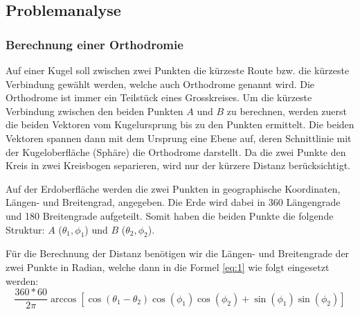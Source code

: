 \subsection{Problemanalyse}
\subsubsection{Berechnung einer Orthodromie}
Auf einer Kugel soll zwischen zwei Punkten die kürzeste Route bzw. die kürzeste
Verbindung gewählt werden, welche auch Orthodrome genannt wird. Die Orthodrome
ist immer ein Teilstück eines Grosskreises. Um die kürzeste Verbindung
zwischen den beiden Punkten $A$ und $B$ zu berechnen, werden zuerst die beiden
Vektoren vom Kugelursprung bis zu den Punkten ermittelt. Die beiden Vektoren
spannen dann mit dem Ursprung eine Ebene auf, deren Schnittlinie mit der
Kugeloberfläche (Sphäre) die Orthodrome darstellt. Da die zwei Punkte den Kreis
in zwei Kreisbogen separieren, wird nur der kürzere Distanz berücksichtigt.


Auf der Erdoberfläche werden die zwei Punkten in geographische Koordinaten,
Längen- und Breitengrad, angegeben. Die Erde wird dabei in 360 Längengrade und
180 Breitengrade aufgeteilt. Somit haben die beiden Punkte die folgende
Struktur: $A$ (\(\theta_1 , \phi_1\)) und $B$ (\(\theta_2 , \phi_2\)).

Für die Berechnung der Distanz benötigen wir die Längen- und Breitengrade der
zwei Punkte in Radian, welche dann in die Formel \eqref{eq:1} wie folgt
eingesetzt werden: \\
\begin{equation}
\label{eq:1}
 \frac{360*60}{2 \pi} \arccos[\cos(\theta_1 - \theta_2) \cos(\phi_1) \cos(\phi_2)+\sin(\phi_1) \sin(\phi_2)]
 \end{equation}




